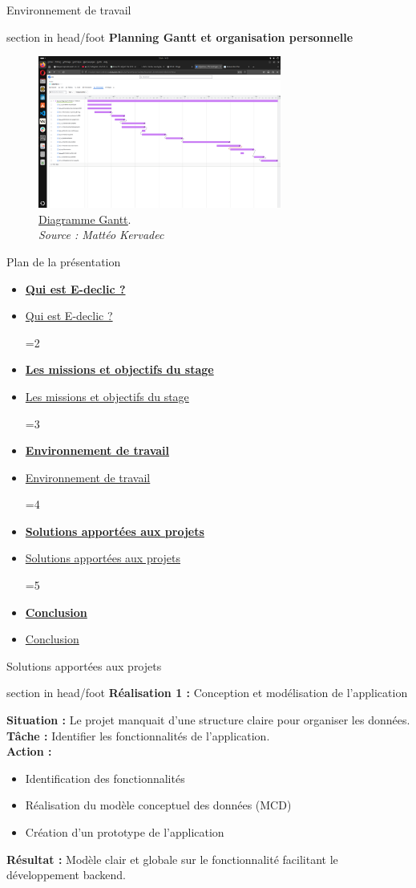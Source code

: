 \documentclass{beamer}
\newcommand{\planLine}[4]{
  \ifnum#1=#2
    \item \hyperlink{#3}{\textbf{\large #4}}
  \else
    \item \hyperlink{#3}{#4}
  \fi
}
\newcommand{\planSlide}[1]{
  	\begin{frame}{Plan de la présentation}
  		\begin{center}
  			\begin{minipage}{1\textwidth}
				\begin{itemize}
      			\planLine{#1}{1}{organisation}{Qui est E-declic ?}
      			\planLine{#1}{2}{sujet}{Les missions et objectifs du stage}
      			\planLine{#1}{3}{environnement}{Environnement de travail}
      			\planLine{#1}{4}{realisation}{Solutions apportées aux projets}
      			\planLine{#1}{5}{conclusion}{Conclusion}
	    		\end{itemize}
  		\end{minipage}
	\end{center}
	\vfill
	\end{frame}
}
\begin{document}
\begin{frame}[label=env]{Environnement de travail}  
	\begin{beamercolorbox}[wd=\paperwidth,ht=1.5em,dp=0.5em,leftskip=0.5cm]{section in head/foot}
  		\large \textbf{Planning Gantt et organisation personnelle}
	\end{beamercolorbox}
	\vspace{0.5em}
	\begin{center}
		\begin{minipage}{0.9\textwidth}
			\begin{figure}[t]
  				\centering
  				\includegraphics[height=5cm]{../img/gantt.png}
  				\caption{
    					\href{https://etudiant-team-z8ihahyp.atlassian.net/jira/software/projects/ECS/boards/1/timeline?timeline=WEEKS}{\underline{Diagramme Gantt}}.\\
    					\textit{Source : Mattéo Kervadec}
  				}
  				\label{fig:gantt}
			\end{figure}
		\end{minipage}
	\end{center}
	\vfill
\end{frame}

\planSlide{4}

\begin{frame}[label=realisation]{Solutions apportées aux projets}
	\begin{beamercolorbox}[wd=\paperwidth,ht=1.5em,dp=0.5em,leftskip=0.5cm]{section in head/foot}
  		\large \textbf{Réalisation 1 :} \normalsize Conception et modélisation de l'application
	\end{beamercolorbox}
	\vspace{0.5em}
	\begin{center}
  		\begin{minipage}{0.9\textwidth}
  			\textbf{Situation :} Le projet manquait d’une structure claire pour organiser les données.\\
  			\textbf{Tâche :} Identifier les fonctionnalités de l'application.\\
  			\textbf{Action :}
  			  	\begin{itemize}
  					\item Identification des fonctionnalités
  					\item Réalisation du modèle conceptuel des données (MCD)
  					\item Création d'un prototype de l'application
  				\end{itemize}
			\textbf{Résultat :} Modèle clair et globale sur le fonctionnalité facilitant le développement backend.
  		\end{minipage}
	\end{center}
	\vfill
\end{frame}
\end{document}
